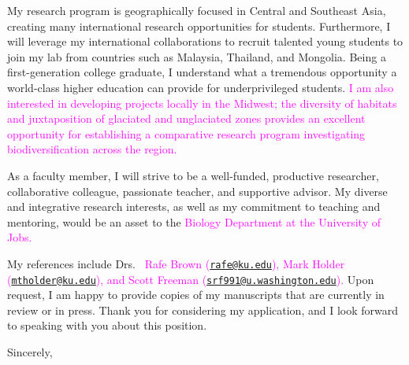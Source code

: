 \documentclass[letterpaper, 10pt]{letter}
\newcommand{\highlight}[1]{\textcolor{magenta}{#1}}
\begin{document}
\begin{letter}


My research program is geographically focused in Central and Southeast Asia,
creating many international research opportunities for students.
Furthermore, I will leverage my international collaborations to recruit
talented young students to join my lab from countries such as Malaysia,
Thailand, and Mongolia.
Being a first-generation college graduate, I understand what a tremendous
opportunity a world-class higher education can provide for underprivileged
students.
\highlight{
I am also interested in developing projects locally in the Midwest; the
diversity of habitats and juxtaposition of glaciated and unglaciated zones
provides an excellent opportunity for establishing a comparative research
program investigating biodiversification across the region.
}


As a faculty member, I will strive to be a well-funded, productive researcher,
collaborative colleague, passionate teacher, and supportive advisor.
My diverse and integrative research interests, as well as my commitment to
teaching and mentoring, would be an asset to the
\highlight{
Biology Department
at
the University of Jobs.
}

My references include Drs.\
\highlight{
Rafe Brown
(\href{mailto:rafe@ku.edu}{\tt rafe@ku.edu}),
Mark Holder
(\href{mailto:mtholder@ku.edu}{\tt mtholder@ku.edu}),
and
Scott Freeman
(\href{mailto:srf991@u.washington.edu}{\tt srf991@u.washington.edu}).
}
Upon request, I am happy to provide copies of my manuscripts that are currently
in review or in press.
Thank you for considering my application, and I look forward to speaking with
you about this position.

\addtolength{\medskipamount}{-5pt}
\closing{Sincerely,}
\end{letter}
\end{document}

